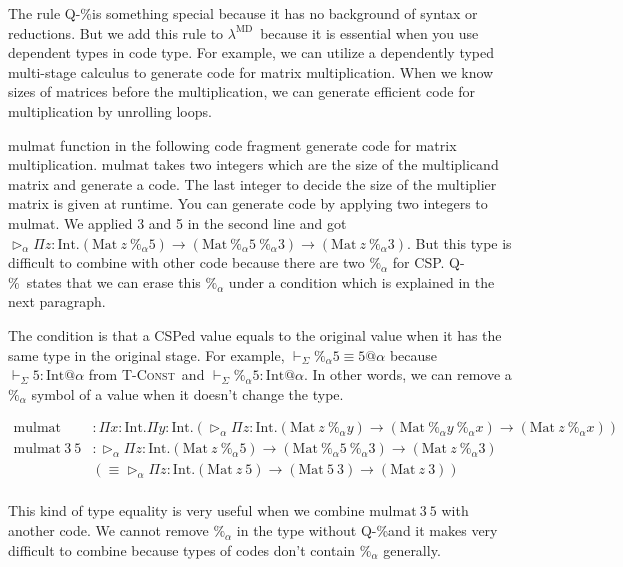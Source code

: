 \documentclass[runningheads]{llncs}
\newcommand{\LMD}{$\lambda^{\textrm{MD}}$\xspace}
\newcommand{\V}{\vdash_\Sigma}
\newcommand{\TW}{\triangleright}
\newcommand{\E}{\equiv}
\newcommand{\TConst}{\textsc{T-Const}}
\newcommand{\QPercent}{\textsc{Q-\%}}
\newcommand{\I}{\textrm{Int}}
\newcommand{\M}{\textrm{Mat}}
\begin{document}
  The rule \QPercent is something special because it has no background of syntax or reductions.
  But we add this rule to \LMD\ because it is essential when you use dependent types in code type.
  For example, we can utilize a dependently typed multi-stage calculus to generate code for matrix multiplication.
  When we know sizes of matrices before the multiplication,
  we can generate efficient code for multiplication by unrolling loops.


  $\text{mulmat}$ function in the following code fragment generate code for matrix multiplication.
  $\text{mulmat}$ takes two integers which are the size of the multiplicand matrix and generate a code.
  The last integer to decide the size of the multiplier matrix is given at runtime.
  You can generate code by applying two integers to $\text{mulmat}$.
  We applied 3 and 5 in the second line and got $\TW_\alpha \Pi z:\I.(\M\ z\ \%_\alpha 5) \to (\M\ \%_\alpha 5\ \%_\alpha 3) \to (\M\ z\ \%_\alpha 3)$.
  But this type is difficult to combine with other code because there are two $\%_\alpha$ for CSP.
  \QPercent\ states that we can erase this $\%_\alpha$ under a condition which is explained in the next paragraph.

  The condition is that a CSPed value equals to the original value when it has the same type in the original stage.
  For example, $\V \%_\alpha 5 \E 5 @ \alpha$ because $ \V 5 : \I @ \alpha $ from \TConst\ and  $ \V \%_\alpha 5 : \I @ \alpha$.
  In other words, we can remove a $\%_\alpha$ symbol of a value when it doesn't change the type.

  {
      \begin{align*}
          \text{mulmat}       & : \Pi x:\I.\Pi y:\I.(\TW_\alpha \Pi z:\I.(\M\ z\ \%_\alpha y) \to (\M\ \%_\alpha y\ \%_\alpha x) \to (\M\ z\ \%_\alpha x)) \\
          \text{mulmat}\ 3\ 5 & : \TW_\alpha \Pi z:\I.(\M\ z\ \%_\alpha 5) \to (\M\ \%_\alpha 5\ \%_\alpha 3) \to (\M\ z\ \%_\alpha 3)                     \\
                              & (\E \TW_\alpha \Pi z:\I.(\M\ z\ 5) \to (\M\ 5\ 3) \to (\M\ z\ 3) )                                                         \\
      \end{align*}
  }

  This kind of type equality is very useful when we combine $\text{mulmat}\ 3\ 5$ with another code.
  We cannot remove $\%_\alpha$ in the type without \QPercent and it makes very difficult to combine
  because types of codes don't contain $\%_\alpha$ generally.
\end{document}
